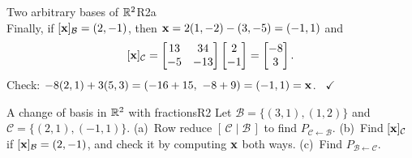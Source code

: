 \documentclass[11pt]{article}
\begin{document}
\begin{exmp}{Two arbitrary bases of $\mathbb{R}^2$}{R2a}
\[\]
Finally, if $[\mathbf{x}]_{\mathcal{B}}=(2,-1)$, then $\mathbf{x}=2(1,-2)-(3,-5)=(-1,1)$ and
\[
[\mathbf{x}]_{\mathcal{C}}=\begin{bmatrix}13&34\\-5&-13\end{bmatrix}\begin{bmatrix}2\\-1\end{bmatrix}=\begin{bmatrix}-8\\3\end{bmatrix}.
\]
Check: $-8(2,1)+3(5,3)=(-16+15,\ -8+9)=(-1,1)=\bv{x}$. \ $\checkmark$
\end{exmp}

\begin{kc}{A change of basis in $\mathbb{R}^2$ with fractions}{R2}
Let $\mathcal{B}=\{(3,1),(1,2)\}$ and $\mathcal{C}=\{(2,1),(-1,1)\}$. (a)~Row reduce $[\,\mathcal{C}\mid\mathcal{B}\,]$ to find $P_{\mathcal{C}\leftarrow\mathcal{B}}$. (b)~Find $[\mathbf{x}]_{\mathcal{C}}$ if $[\mathbf{x}]_{\mathcal{B}}=(2,-1)$, and check it by computing $\mathbf{x}$ both ways. (c)~Find $P_{\mathcal{B}\leftarrow\mathcal{C}}$.
\end{kc}
\end{document}
